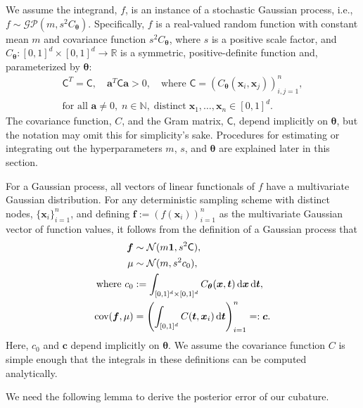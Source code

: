 \documentclass{svjour3}                     %
\newcommand{\bm}[1]{\boldsymbol{#1}}
\newcommand{\dif}[1]{\text{d}{#1}}
\newcommand{\D}[1]{\text{d}{#1}}
\newcommand{\vtheta}{{\bm{\theta}}}
\newcommand{\va}{\bm{a}}
\newcommand{\vc}{\bm{c}}
\newcommand{\vf}{\bm{f}}
\newcommand{\vt}{\bm{t}}
\newcommand{\vx}{\bm{x}}
\newcommand{\vone}{\bm{1}}
\newcommand{\mC}{\mathsf{C}}
\newcommand{\cov}{{\textup{cov}}}
\newcommand{\calN}{\mathcal{N}}
\begin{document}
We assume the integrand, $f$, is an instance of a stochastic Gaussian process, i.e., $f \sim \mathcal{GP}(m,s^2 C_\vtheta)$.  Specifically, $f$ is a real-valued random function with constant mean $m$ and covariance function $s^2C_\vtheta$, where $s$ is a positive scale factor, and $C_\vtheta: [0,1]^d \times [0,1]^d \to \mathbb{R} $ is a symmetric, positive-definite function and, parameterized by $\vtheta$:
\begin{multline} \label{FJH:eq:CondPosDef}
\mC^T = \mC,  \quad \va^T \mC \va > 0, \quad \text{where }  \mC = \left(  C_\vtheta(\vx_i,\vx_j)  \right)_{i,j=1}^n,\\
\text{for all } \va \ne 0, \;
n\in \mathbb{N}, \; \text{distinct} \; \vx_1, \ldots, \vx_n \in [0,1]^d.
\end{multline}
The covariance function, $C$, and the Gram matrix, $\mC$, depend implicitly on $\vtheta$, but the notation may omit this for simplicity's sake.
Procedures for estimating or integrating out the hyperparameters $m$, $s$, and $\vtheta$ are explained later in this section.

For a Gaussian process, all vectors of linear functionals of $f$ have a multivariate Gaussian distribution. 
For any deterministic sampling scheme with distinct nodes, $\{\vx_i\}_{i=1}^n$, and defining  $\vf  := \left( f(\vx_i)\right)_{i=1}^n$ as the multivariate Gaussian vector of function values, it follows from the definition of a Gaussian process that 
\begin{subequations} \label{eqn:fGaussDist}
	\begin{align}
	\vf  & \sim \calN(m \vone, s^2 \mC), \\
	\mu & \sim \calN(m, s^2 c_0), \\
	\label{eqn:fGaussDist_c0}
	\text{where }
	c_0 &:= \int_{[0,1]^{d} \times [0,1]^{d}} C_\vtheta(\vx,\vt) \, \dif{\vx} \, \dif{\vt}, \\
	\label{eqn:fGaussDist_vc}
	\cov(\vf, \mu) &= \left(  \int_{[0,1]^d} C(\vt,\vx_i) \, \D \vt \right)_{i=1}^n  =: \vc.
	\end{align}
\end{subequations}
Here, $c_0$ and $\vc$ depend implicitly on $\vtheta$.  We assume the covariance function $C$ is simple enough that the integrals in these definitions can be computed analytically.

\iffalse
We need the following lemma to derive the posterior error of our cubature. 
\end{document}
